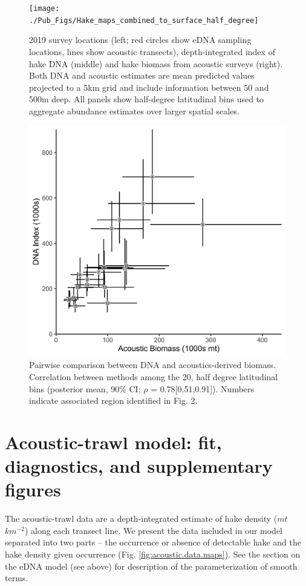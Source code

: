 \documentclass[
]{article}
\begin{document}
\begin{figure}
\texttt{[image: ./Pub\_Figs/Hake\_maps\_combined\_to\_surface\_half\_degree]} \caption{\label{fig:surface.compare.half} 2019 survey locations (left; red circles show eDNA sampling locations, lines show acoustic transects), depth-integrated  index of hake DNA (middle) and hake biomass from acoustic surveys (right).  Both DNA and acoustic estimates are mean predicted values projected to a 5km grid and include information between 50 and 500m deep. All panels show half-degree latitudinal bins used to aggregate abundance estimates over larger spatial scales.    }\label{fig:fig.surface.compare.half}
\end{figure}

\begin{figure}
\includegraphics[width=0.6\linewidth]{./Pub_Figs/Hake_DNA-Acoustic_bivariate_correlation_0.5} \caption{\label{fig:pairwise} Pairwise comparison between  DNA and acoustics-derived biomass. Correlation between methods among the 20, half degree latitudinal bins (posterior mean, 90\% CI; \(\rho\) = 0.78{[}0.51,0.91{]}). Numbers indicate associated region identified in Fig. 2.  }\label{fig:fig.pairwise}
\end{figure}

\newpage
\clearpage

\hypertarget{acoustic-trawl-model-fit-diagnostics-and-supplementary-figures}{%
\section{Acoustic-trawl model: fit, diagnostics, and supplementary
figures}\label{acoustic-trawl-model-fit-diagnostics-and-supplementary-figures}}

The acoustic-trawl data are a depth-integrated estimate of hake density
(\(mt\) \(km^{-2}\)) along each transect line. We present the data
included in our model separated into two parts -- the occurrence or
absence of detectable hake and the hake density given occurrence (Fig.
\ref{fig:acoustic.data.maps}). See the section on the eDNA model (see
above) for description of the parameterization of smooth terms.
\end{document}
